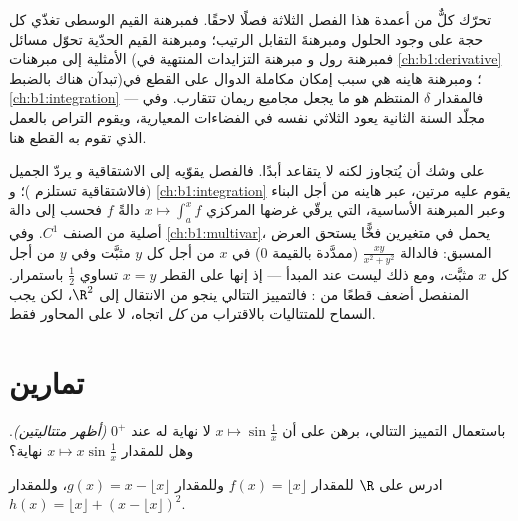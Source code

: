 \begin{remark}
تحرّك كلٌّ من أعمدة هذا الفصل الثلاثة فصلًا لاحقًا. فمبرهنة
القيم الوسطى تغذّي كل حجة على وجود الحلول
ومبرهنةَ التقابل الرتيب؛ ومبرهنة القيم
الحدّية تحوّل مسائل الأمثلية إلى مبرهنات (فمبرهنة رول و
مبرهنة التزايدات المنتهية في \cref{ch:b1:derivative} تبدآن هناك
بالضبط)؛ ومبرهنة هاينه هي سبب إمكان مكاملة الدوال 
على القطع في \cref{ch:b1:integration} --- فالمقدار $\delta$
المنتظم هو ما يجعل مجاميع ريمان تتقارب. وفي مجلّد السنة
الثانية يعود الثلاثي نفسه في الفضاءات المعيارية، ويقوم
التراص بالعمل الذي تقوم به القطع هنا.
\end{remark}

\begin{remark}
 على وشك أن يُتجاوز لكنه لا يتقاعد أبدًا.
فالفصل  يقوّيه إلى الاشتقاقية و
يردّ الجميل (فالاشتقاقية تستلزم )؛
و \cref{ch:b1:integration} يقوم عليه مرتين، عبر هاينه من أجل
البناء وعبر المبرهنة الأساسية، التي يرقّي
غرضها المركزي $x \mapsto \int_a^x f$ دالةً $f$  فحسب
إلى دالة أصلية من الصنف $C^1$. وفي
\cref{ch:b1:multivar}، يحمل  في متغيرين فخًّا
يستحق العرض المسبق: فالدالة $\frac{xy}{x^2 + y^2}$ (ممدَّدة
بالقيمة $0$)  في $x$ من أجل كل $y$ مثبَّت وفي $y$ من أجل
كل $x$ مثبَّت، ومع ذلك ليست  عند المبدأ --- إذ إنها على
القطر $x = y$ تساوي $\frac12$ باستمرار.  المنفصل
أضعف قطعًا من : فالتمييز التتالي
ينجو من الانتقال إلى $\R^2$، لكن يجب السماح للمتتاليات
بالاقتراب من \emph{كل} اتجاه، لا على المحاور فقط.
\end{remark}

\section{تمارين}

\begin{exercise}[$\star$]\label{exo:b1:continuity:1}
باستعمال التمييز التتالي، برهن على أن $x \mapsto
\sin\frac 1x$ لا نهاية له عند $0^+$ \emph{(أظهر متتاليتين)}.
وهل للمقدار $x \mapsto x \sin\frac 1x$ نهاية؟
\end{exercise}

\begin{exercise}[$\star$]\label{exo:b1:continuity:2}
ادرس  على $\R$ للمقدار $f(x) = \lfloor x \rfloor$ وللمقدار
$g(x) = x - \lfloor x \rfloor$، وللمقدار $h(x) = \lfloor x \rfloor +
(x - \lfloor x\rfloor)^2$.
\end{exercise}

